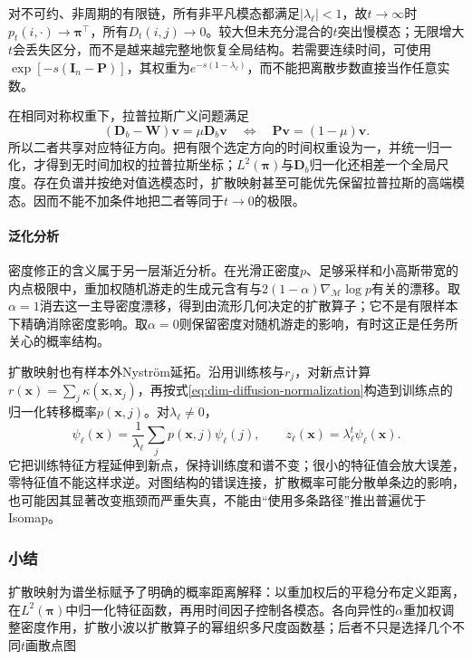对不可约、非周期的有限链，所有非平凡模态都满足$|\lambda_\ell|<1$，故$t\to\infty$时$p_t(i,\cdot)\to\bm{\pi}^{\top}$，所有$D_t(i,j)\to0$。较大但未充分混合的$t$突出慢模态；无限增大$t$会丢失区分，而不是越来越完整地恢复全局结构。若需要连续时间，可使用$\exp[-s(\bm{I}_n-\bm{P})]$，其权重为$e^{-s(1-\lambda_\ell)}$，而不能把离散步数直接当作任意实数。

在相同对称权重下，拉普拉斯广义问题满足
\[
  (\bm{D}_b-\bm{W})\bm{v}=\mu\bm{D}_b\bm{v}
  \quad\Longleftrightarrow\quad
  \bm{P}\bm{v}=(1-\mu)\bm{v}.
\]
所以二者共享对应特征方向。把有限个选定方向的时间权重设为一，并统一归一化，才得到无时间加权的拉普拉斯坐标；$L^2(\bm{\pi})$与$\bm{D}_b$归一化还相差一个全局尺度。存在负谱并按绝对值选模态时，扩散映射甚至可能优先保留拉普拉斯的高端模态。因而不能不加条件地把二者等同于$t\to0$的极限。

\paragraph{泛化分析}

密度修正的含义属于另一层渐近分析。在光滑正密度$p$、足够采样和小高斯带宽的内点极限中，重加权随机游走的生成元含有与$2(1-\alpha)\nabla_{\mathcal{M}}\log p$有关的漂移。取$\alpha=1$消去这一主导密度漂移，得到由流形几何决定的扩散算子；它不是有限样本下精确消除密度影响。取$\alpha=0$则保留密度对随机游走的影响，有时这正是任务所关心的概率结构。

扩散映射也有样本外Nystr\"om延拓。沿用训练核与$r_j$，对新点计算$r(\bm{x})=\sum_j\kappa(\bm{x},\bm{x}_j)$，再按式\eqref{eq:dim-diffusion-normalization}构造到训练点的归一化转移概率$p(\bm{x},j)$。对$\lambda_\ell\ne0$，
\begin{equation}
  \label{eq:dim-diffusion-extension}
  \psi_\ell(\bm{x})
  =\frac1{\lambda_\ell}\sum_jp(\bm{x},j)\psi_\ell(j),
  \qquad
  z_\ell(\bm{x})=\lambda_\ell^t\psi_\ell(\bm{x}).
\end{equation}
它把训练特征方程延伸到新点，保持训练度和谱不变；很小的特征值会放大误差，零特征值不能这样求逆。对图结构的错误连接，扩散概率可能分散单条边的影响，也可能因其显著改变瓶颈而严重失真，不能由“使用多条路径”推出普遍优于Isomap。

\subsubsection{小结}

扩散映射为谱坐标赋予了明确的概率距离解释：以重加权后的平稳分布定义距离，在$L^2(\bm{\pi})$中归一化特征函数，再用时间因子控制各模态。各向异性的$\alpha$重加权调整密度作用，扩散小波以扩散算子的幂组织多尺度函数基；后者不只是选择几个不同$t$画散点图

